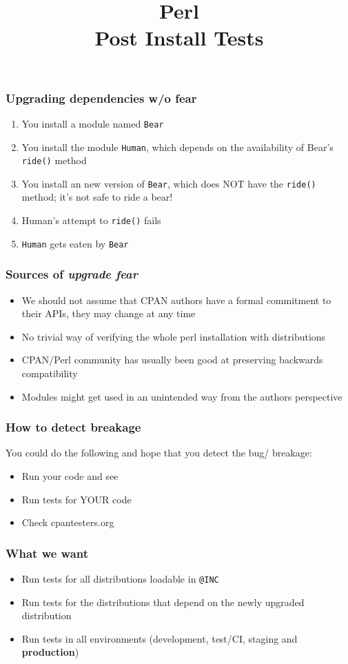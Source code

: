 \documentclass[10pt]{beamer}
\title{Perl \\ Post Install Tests}
\begin{document}
\begin{frame}
\titlepage
\end{frame}


\begin{frame}[fragile]
\frametitle{Upgrading dependencies w/o fear}
\begin{enumerate}
  \item You install a module named \verb|Bear|
  \item You install the module \verb|Human|, which depends on the availability of Bear's \verb|ride()| method
  \item You install an new version of \verb|Bear|, which does NOT have the \verb|ride()| method; it's not safe to ride a bear!
  \item Human's attempt to \verb|ride()| fails
  \item \verb|Human| gets eaten by \verb|Bear|
\end{enumerate}
\end{frame}

\begin{frame}
\frametitle{Sources of \emph{upgrade fear}}
\begin{itemize}
\item We should not assume that CPAN authors have a formal commitment to their APIs, they may change at any time
\item No trivial way of verifying the whole perl installation with distributions
\item CPAN/Perl community has usually been good at preserving backwards compatibility
\item Modules might get used in an unintended way from the authors perspective
\end{itemize}
\end{frame}

\begin{frame}[fragile]
\frametitle{How to detect breakage}
You could do the following and hope that you detect the bug/ breakage:
\begin{itemize}
\item Run your code and see
\item Run tests for YOUR code
\item Check cpantesters.org
\end{itemize}
\end{frame}
\begin{frame}[fragile]
\frametitle{What we want}
\begin{itemize}
\item Run tests for all distributions loadable in \verb|@INC|
\item Run tests for the distributions that depend on the newly upgraded distribution
\item Run tests in all environments (development, test/CI, staging and {\bf production})
\end{itemize}
\end{frame}
\end{document}
